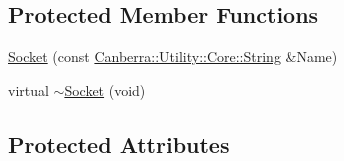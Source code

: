 \subsection*{Protected Member Functions}
\begin{DoxyCompactItemize}
\item 
\hyperlink{class_canberra_1_1_utility_1_1_network_1_1_socket_a389aebe967a9895427c19e1e49a39951_a389aebe967a9895427c19e1e49a39951}{Socket} (const \hyperlink{class_canberra_1_1_utility_1_1_core_1_1_string}{Canberra\+::\+Utility\+::\+Core\+::\+String} \&Name)
\item 
virtual \hyperlink{class_canberra_1_1_utility_1_1_network_1_1_socket_a2dfd33d9c2d7c22d9d753c961b9b4cec_a2dfd33d9c2d7c22d9d753c961b9b4cec}{$\sim$\+Socket} (void)
\end{DoxyCompactItemize}
\subsection*{Protected Attributes}
